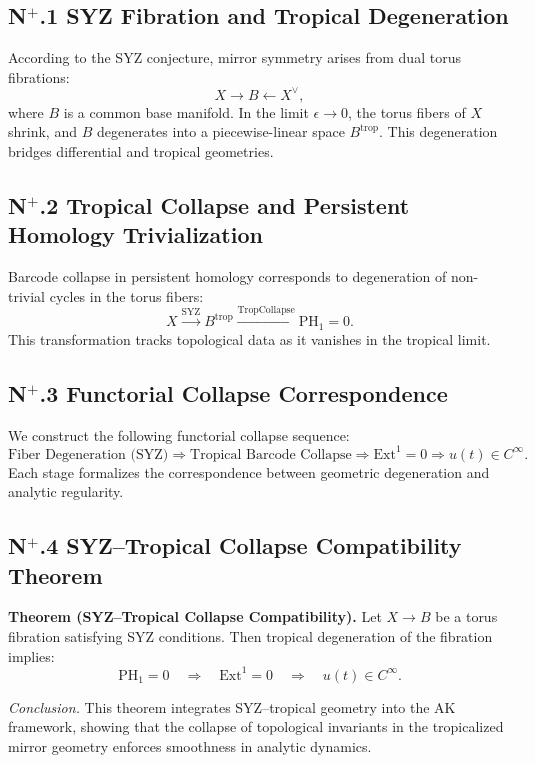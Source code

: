 \documentclass[11pt]{article}
\begin{document}
\begin{axiom}
\begin{axiom}
{{\subsection*{N$^+$.1 SYZ Fibration and Tropical Degeneration}
According to the SYZ conjecture, mirror symmetry arises from dual torus fibrations:
\[
X \to B \leftarrow X^\vee,
\]
where \( B \) is a common base manifold. In the limit \( \epsilon \to 0 \), the torus fibers of \( X \) shrink, and \( B \) degenerates into a piecewise-linear space \( B^{\mathrm{trop}} \). This degeneration bridges differential and tropical geometries.

\subsection*{N$^+$.2 Tropical Collapse and Persistent Homology Trivialization}
Barcode collapse in persistent homology corresponds to degeneration of non-trivial cycles in the torus fibers:
\[
X \xrightarrow{\mathrm{SYZ}} B^{\mathrm{trop}} \xrightarrow{\mathrm{TropCollapse}} \mathrm{PH}_1 = 0.
\]
This transformation tracks topological data as it vanishes in the tropical limit.

\subsection*{N$^+$.3 Functorial Collapse Correspondence}
We construct the following functorial collapse sequence:
\[
\text{Fiber Degeneration (SYZ)} \Rightarrow \text{Tropical Barcode Collapse} \Rightarrow \mathrm{Ext}^1 = 0 \Rightarrow u(t) \in C^\infty.
\]
Each stage formalizes the correspondence between geometric degeneration and analytic regularity.

\subsection*{N$^+$.4 SYZ–Tropical Collapse Compatibility Theorem}
\textbf{Theorem (SYZ–Tropical Collapse Compatibility).}  
Let \( X \to B \) be a torus fibration satisfying SYZ conditions. Then tropical degeneration of the fibration implies:
\[
\mathrm{PH}_1 = 0 \quad \Rightarrow \quad \mathrm{Ext}^1 = 0 \quad \Rightarrow \quad u(t) \in C^\infty.
\]

\textit{Conclusion.}  
This theorem integrates SYZ–tropical geometry into the AK framework, showing that the collapse of topological invariants in the tropicalized mirror geometry enforces smoothness in analytic dynamics.



}}
\end{axiom}
\end{axiom}
\end{document}
